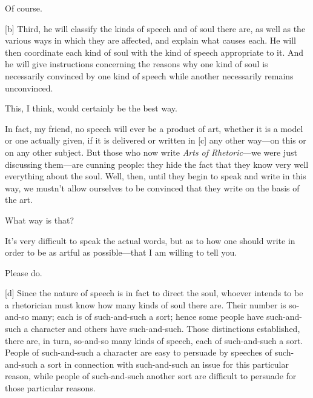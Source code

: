 \sayphaedrus Of course.

{[}b{]} \saysocrates Third, he will classify the kinds of speech and of
soul there are, as well as the various ways in which they are affected,
and explain what causes each. He will then coordinate each kind of soul
with the kind of speech appropriate to it. And he will give instructions
concerning the reasons why one kind of soul is necessarily convinced by
one kind of speech while another necessarily remains unconvinced.

\sayphaedrus This, I think, would certainly be the best way.

\saysocrates In fact, my friend, no speech will ever be a product of art,
whether it is a model or one actually given, if it is delivered or
written in {[}c{]} any other way---on this or on any other subject. But
those who now write {\em Arts of Rhetoric}---we were just discussing
them---are cunning people: they hide the fact that they know very well
everything about the soul. Well, then, until they begin to speak and
write in this way, we mustn't allow ourselves to be convinced that they
write on the basis of the art.

\sayphaedrus What way is that?

\saysocrates It's very difficult to speak the actual words, but as to how
one should write in order to be as artful as possible---that I am
willing to tell you.

\sayphaedrus Please do.

{[}d{]} \saysocrates Since the nature of speech is in fact to direct the
soul, whoever intends to be a rhetorician must know how many kinds of
soul there are. Their number is so-and-so many; each is of such-and-such
a sort; hence some people have such-and-such a character and others have
such-and-such. Those distinctions established, there are, in turn,
so-and-so many kinds of speech, each of such-and-such a sort. People of
such-and-such a character are easy to persuade by speeches of
such-and-such a sort in connection with such-and-such an issue for this
particular reason, while people of such-and-such another sort are
difficult to persuade for those particular reasons.

